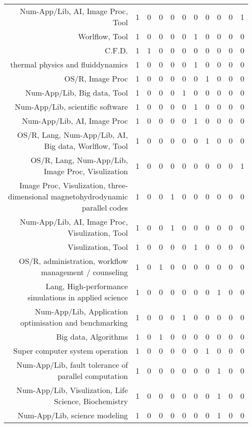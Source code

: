 {\begin{landscape}
\begin{longtable}[htb]{r|c|c|c|c|c|c|c|c|c|c}
{Num-App/Lib, AI, Image Proc, Tool} & 1 & 0 & 0 & 0 & 0 & 0 & 0 & 0 & 0 & 1 \\%
{Worlflow, Tool} & 1 & 0 & 0 & 0 & 0 & 1 & 0 & 0 & 0 & 0 \\%
{C.F.D.} & 1 & 1 & 0 & 0 & 0 & 0 & 0 & 0 & 0 & 0 \\%
{thermal physics and fluiddynamics} & 1 & 0 & 0 & 0 & 0 & 1 & 0 & 0 & 0 & 0 \\%
{OS/R, Image Proc} & 1 & 0 & 0 & 0 & 0 & 0 & 1 & 0 & 0 & 0 \\%
{Num-App/Lib, Big data, Tool} & 1 & 0 & 0 & 0 & 1 & 0 & 0 & 0 & 0 & 0 \\%
{Num-App/Lib, scientific software} & 1 & 0 & 0 & 0 & 0 & 1 & 0 & 0 & 0 & 0 \\%
{Num-App/Lib, AI, Image Proc} & 1 & 0 & 0 & 0 & 0 & 1 & 0 & 0 & 0 & 0 \\%
{OS/R, Lang, Num-App/Lib, AI, Big data, Worlflow, Tool} & 1 & 0 & 0 & 0 & 0 & 0 & 1 & 0 & 0 & 0 \\%
{OS/R, Lang, Num-App/Lib, Image Proc, Visulization} & 1 & 0 & 0 & 0 & 0 & 0 & 0 & 0 & 0 & 1 \\%
{Image Proc, Visulization, three-dimensional magnetohydrodynamic parallel codes} & 1 & 0 & 0 & 1 & 0 & 0 & 0 & 0 & 0 & 0 \\%
{Num-App/Lib, AI, Image Proc, Visulization, Tool} & 1 & 0 & 0 & 1 & 0 & 0 & 0 & 0 & 0 & 0 \\%
{Visulization, Tool} & 1 & 0 & 0 & 0 & 0 & 1 & 0 & 0 & 0 & 0 \\%
{OS/R, administration, workflow management / counseling} & 1 & 0 & 1 & 0 & 0 & 0 & 0 & 0 & 0 & 0 \\%
{Lang, High-performance simulations in applied science} & 1 & 0 & 0 & 0 & 0 & 0 & 0 & 1 & 0 & 0 \\%
{Num-App/Lib, Application optimisation and benchmarking} & 1 & 0 & 0 & 0 & 1 & 0 & 0 & 0 & 0 & 0 \\%
{Big data, Algorithms} & 1 & 0 & 1 & 0 & 0 & 0 & 0 & 0 & 0 & 0 \\%
{Super computer system operation} & 1 & 0 & 0 & 0 & 0 & 0 & 1 & 0 & 0 & 0 \\%
{Num-App/Lib, fault tolerance of parallel computation} & 1 & 0 & 0 & 0 & 0 & 0 & 0 & 1 & 0 & 0 \\%
{Num-App/Lib, Visulization, Life Science, Biochemistry} & 1 & 0 & 0 & 0 & 0 & 0 & 0 & 1 & 0 & 0 \\%
{Num-App/Lib, science modeling} & 1 & 0 & 0 & 0 & 0 & 0 & 0 & 1 & 0 & 0 \\%

\end{longtable}
\end{landscape}}
